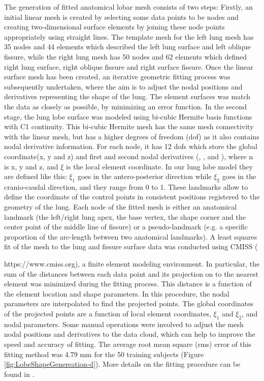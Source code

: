 The generation of fitted anatomical lobar mesh consists of two steps: Firstly, an initial linear mesh is created by selecting some data points to be nodes and creating two-dimensional surface elements by joining these node points appropriately using straight lines. The template mesh for the left lung mesh has 35 nodes and 44 elements which described the left lung surface and left oblique fissure, while the right lung mesh has 50 nodes and 62 elements which defined right lung surface, right oblique fissure and right surface fissure. Once the linear surface mesh has been created, an iterative geometric fitting process was subsequently undertaken, where the aim is to adjust the nodal positions and derivatives representing the shape of the lung. The element surfaces was match the data as closely as possible, by minimizing an error function. In the second stage, the lung lobe surface was modeled using bi-cubic Hermite basis functions with C1 continuity. This bi-cubic Hermite mesh has the same mesh connectivity with the linear mesh, but has a higher degrees of freedom (\gls{dof}) as it also contains nodal derivative information. For each node, it has 12 \gls{dof}s which store the global coordinate(x, y and z) and first and second nodal derivatives (, , and ), where n is x, y and z, and $\xi$ is the local element coordinate. In our lung lobe model they are defined like this: $\xi_1$ goes in the antero-posterior direction while $\xi_2$ goes in the cranio-caudal direction, and they range from 0 to 1. These landmarks allow to define the coordinate of the control points in consistent positions registered to the geometry of the lung. Each node of the fitted mesh is either an anatomical landmark (the left/right lung apex, the base vertex, the shape corner and the center point of the middle line of fissure) or a pseudo-landmark (e.g. a specific proportion of the arc-length between two anatomical landmarks). A least squares fit of the mesh to the lung and fissure surface data was conducted using CMISS ({https://www.cmiss.org), a finite element modeling environment. In particular, the sum of the distances between each data point and its projection on to the nearest element was minimized during the fitting process. This distance is a function of the element location and shape parameters. In this procedure, the nodal parameters are interpolated to find the projected points. The global coordinates of the projected points are a function of local element coordinates, $\xi_1$ and $\xi_2$, and nodal parameters. Some manual operations were involved to adjust the mesh nodal positions and derivatives to the data cloud, which can help to improve the speed and accuracy of fitting. The average root mean square (\gls{rms}) error of this fitting method was 4.79 mm for the 50 training subjects (Figure \ref{fig:LobeShapeGenereation-d}). More details on the fitting procedure can be found in  \citep{bradley1997geometric,tawhai2003developing, fernandez2004anatomically}.  


}
